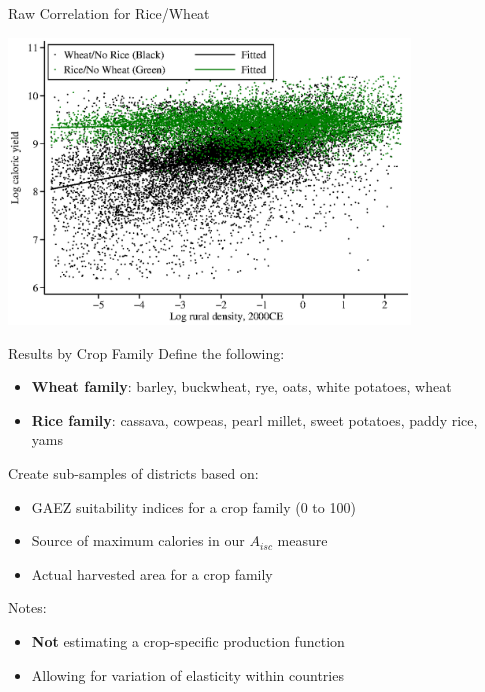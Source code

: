 \documentclass[10pt, xcolor=dvipsnames]{beamer}
\begin{document}
\begin{frame}{Raw Correlation for Rice/Wheat}
\begin{center}
\includegraphics[width=0.8\textwidth]{fig_beta_crop.eps}
\end{center}
\end{frame}

\begin{frame}{Results by Crop Family}
Define the following:
\begin{itemize}
  \item \textbf{Wheat family}: barley, buckwheat, rye, oats, white potatoes, wheat
  \item \textbf{Rice family}: cassava, cowpeas, pearl millet, sweet potatoes, paddy rice, yams
\end{itemize}
Create sub-samples of districts based on: 
\begin{itemize}
  \item GAEZ suitability indices for a crop family (0 to 100)
  \item Source of maximum calories in our $A_{isc}$ measure
  \item Actual harvested area for a crop family
\end{itemize}
Notes:
\begin{itemize}
  \item \textbf{Not} estimating a crop-specific production function
  \item Allowing for variation of elasticity within countries
\end{itemize}

\end{frame}
\end{document}
